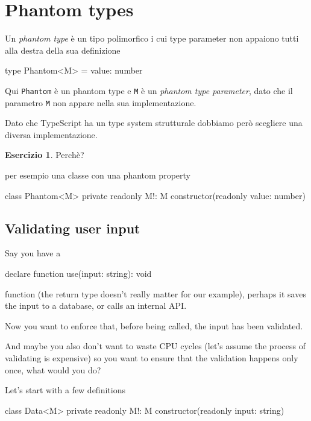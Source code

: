 \documentclass[12pt]{article}
\theoremstyle{definition}
\newtheorem{exercise}{Esercizio}[subsection]
\newenvironment{code}
  {\vspace{0.5cm} \VerbatimEnvironment\begin{typescriptcode}}
  {\end{typescriptcode} \vspace{0.2cm}}
\begin{document}
\section{Phantom types}

Un \emph{phantom type} è un tipo polimorfico i cui type parameter non appaiono tutti alla destra della sua definizione

\begin{code}
type Phantom<M> = { value: number }
\end{code}

Qui \texttt{Phantom} è un phantom type e \texttt{M} è un \emph{phantom type parameter},
dato che il parametro \texttt{M} non appare nella sua implementazione.

Dato che TypeScript ha un type system strutturale dobbiamo però scegliere una diversa implementazione.

\begin{exercise}
Perchè?
\end{exercise}

per esempio una classe con una phantom property

\begin{code}
class Phantom<M> {
  private readonly M!: M
  constructor(readonly value: number) {}
}
\end{code}

\subsection{Validating user input}

Say you have a

\begin{code}
declare function use(input: string): void
\end{code}

function (the return type doesn't really matter for our example),
perhaps it saves the input to a database, or calls an internal API.

Now you want to enforce that, before being called, the input has been validated.

And maybe you also don't want to waste CPU cycles (let's assume the process of validating is expensive)
so you want to ensure that the validation happens only once, what would you do?

Let's start with a few definitions

\begin{code}
class Data<M> {
  private readonly M!: M
  constructor(readonly input: string) {}
}
\end{code}
\end{document}
